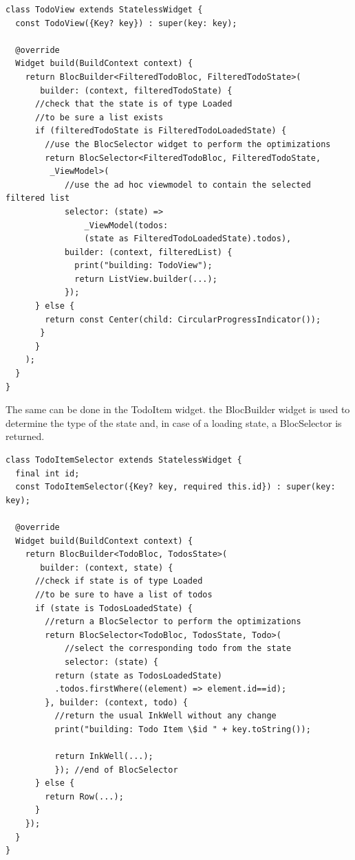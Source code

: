 \begin{code}
 \mbox{}
\label{code:2.14}
\begin{verbatim}
class TodoView extends StatelessWidget {
  const TodoView({Key? key}) : super(key: key);

  @override
  Widget build(BuildContext context) {
    return BlocBuilder<FilteredTodoBloc, FilteredTodoState>(
       builder: (context, filteredTodoState) {
      //check that the state is of type Loaded
      //to be sure a list exists
      if (filteredTodoState is FilteredTodoLoadedState) {
        //use the BlocSelector widget to perform the optimizations
        return BlocSelector<FilteredTodoBloc, FilteredTodoState,
         _ViewModel>(
            //use the ad hoc viewmodel to contain the selected filtered list
            selector: (state) =>
                _ViewModel(todos: 
                (state as FilteredTodoLoadedState).todos),
            builder: (context, filteredList) {
              print("building: TodoView");
              return ListView.builder(...);
            });
      } else {
        return const Center(child: CircularProgressIndicator());
       }
      }
    );
  }
}
\end{verbatim}
\mbox{}
\end{code}

The same can be done in the TodoItem widget. the BlocBuilder widget is used to determine the type of the state and, in case of a loading state, a BlocSelector is returned.

\begin{code}
 \mbox{}
\label{code:2.14}
\begin{verbatim}
class TodoItemSelector extends StatelessWidget {
  final int id;
  const TodoItemSelector({Key? key, required this.id}) : super(key: key);

  @override
  Widget build(BuildContext context) {
    return BlocBuilder<TodoBloc, TodosState>(
       builder: (context, state) {
      //check if state is of type Loaded
      //to be sure to have a list of todos
      if (state is TodosLoadedState) {
        //return a BlocSelector to perform the optimizations
        return BlocSelector<TodoBloc, TodosState, Todo>(
            //select the corresponding todo from the state
            selector: (state) {
          return (state as TodosLoadedState)
          .todos.firstWhere((element) => element.id==id);
        }, builder: (context, todo) {
          //return the usual InkWell without any change
          print("building: Todo Item \$id " + key.toString());

          return InkWell(...);
          }); //end of BlocSelector
      } else {
        return Row(...);
      }
    });
  }
}
\end{verbatim}
\mbox{}
\end{code}

